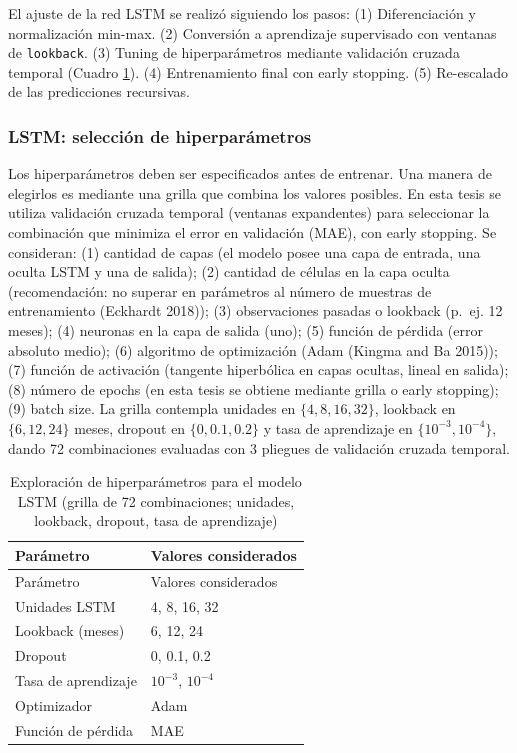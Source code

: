 \documentclass[
  12pt, a4paper, oneside]{article}
\begin{document}
El ajuste de la red LSTM se realizó siguiendo los pasos: (1) Diferenciación y normalización min-max. (2) Conversión a aprendizaje supervisado con ventanas de \texttt{lookback}. (3) Tuning de hiperparámetros mediante validación cruzada temporal (Cuadro \ref{tab:grid-lstm}). (4) Entrenamiento final con early stopping. (5) Re-escalado de las predicciones recursivas.

\subsubsection{LSTM: selección de hiperparámetros}\label{lstm-selecciuxf3n-de-hiperparuxe1metros}

Los hiperparámetros deben ser especificados antes de entrenar. Una manera de elegirlos es mediante una grilla que combina los valores posibles. En esta tesis se utiliza validación cruzada temporal (ventanas expandentes) para seleccionar la combinación que minimiza el error en validación (MAE), con early stopping. Se consideran: (1) cantidad de capas (el modelo posee una capa de entrada, una oculta LSTM y una de salida); (2) cantidad de células en la capa oculta (recomendación: no superar en parámetros al número de muestras de entrenamiento (Eckhardt 2018)); (3) observaciones pasadas o lookback (p.~ej. 12 meses); (4) neuronas en la capa de salida (uno); (5) función de pérdida (error absoluto medio); (6) algoritmo de optimización (Adam (Kingma and Ba 2015)); (7) función de activación (tangente hiperbólica en capas ocultas, lineal en salida); (8) número de epochs (en esta tesis se obtiene mediante grilla o early stopping); (9) batch size. La grilla contempla unidades en \(\{4, 8, 16, 32\}\), lookback en \(\{6, 12, 24\}\) meses, dropout en \(\{0, 0.1, 0.2\}\) y tasa de aprendizaje en \(\{10^{-3}, 10^{-4}\}\), dando 72 combinaciones evaluadas con 3 pliegues de validación cruzada temporal.

\begin{longtable}[]{@{}ll@{}}
\caption{\label{tab:grid-lstm} Exploración de hiperparámetros para el modelo LSTM (grilla de 72 combinaciones; unidades, lookback, dropout, tasa de aprendizaje)}\tabularnewline
\toprule\noalign{}
Parámetro & Valores considerados \\
\midrule\noalign{}
\endfirsthead
\toprule\noalign{}
Parámetro & Valores considerados \\
\midrule\noalign{}
\endhead
\bottomrule\noalign{}
\endlastfoot
Unidades LSTM & 4, 8, 16, 32 \\
Lookback (meses) & 6, 12, 24 \\
Dropout & 0, 0.1, 0.2 \\
Tasa de aprendizaje & \(10^{-3}\), \(10^{-4}\) \\
Optimizador & Adam \\
Función de pérdida & MAE \\
\end{longtable}
\end{document}
